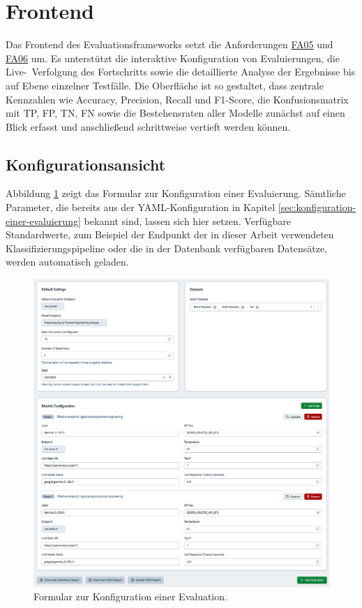 \section{Frontend}\label{sec:visualisierung-im-frontend}

Das Frontend des Evaluationsframeworks setzt die Anforderungen \hyperlink{FA05}{FA05} und \hyperlink{FA06}{FA06} um. Es unterstützt die interaktive Konfiguration von Evaluierungen, die Live-\linebreak~Verfolgung des Fortschritts sowie die detaillierte Analyse der Ergebnisse bis auf Ebene einzelner Testfälle. Die Oberfläche ist so gestaltet, dass zentrale Kennzahlen wie Accuracy, Precision, Recall und F1-Score, die Konfusionsmatrix mit \ac{TP}, \ac{FP}, \ac{TN}, \ac{FN} sowie die Bestehensraten aller Modelle zunächst auf einen Blick erfasst und anschließend schrittweise vertieft werden können.

\subsection*{Konfigurationsansicht}

Abbildung \ref{fig:evaluation-config} zeigt das Formular zur Konfiguration einer Evaluierung. Sämtliche Parameter, die bereits aus der YAML-Konfiguration in Kapitel \ref{sec:konfiguration-einer-evaluierung} bekannt sind, lassen sich hier setzen. Verfügbare Standardwerte, zum Beispiel der Endpunkt der in dieser Arbeit verwendeten Klassifizierungspipeline oder die in der Datenbank verfügbaren Datensätze, werden automatisch geladen.

\begin{figure}[h]
    \centering
    \includegraphics[width=\textwidth]{images/evaluation/evaluation-config_new}
    \caption{Formular zur Konfiguration einer Evaluation.}
    \label{fig:evaluation-config}
\end{figure}

